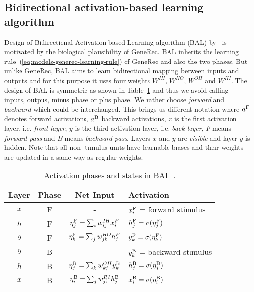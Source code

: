 \subsection{Bidirectional activation-based learning algorithm} 
\label{sec:models-bal} 

Design of Bidirectional Activation-based Learning algorithm (BAL) by~\citet{farkas2013bal} is motivated by the biological plausibility of GeneRec. BAL inherits the learning rule~(\ref{eq:models-generec-learning-rule}) of GeneRec and also the two phases. But unlike GeneRec, BAL aims to learn bidirectional mapping between inputs and outputs and for this purpose it uses four weights $W^{IH}$, $W^{HO}$, $W^{OH}$ and $W^{HI}$. The design of BAL is symmetric as shown in Table~\ref{tab:models-bal-activation} and thus we avoid calling inputs, outpus, minus phase or plus phase. We rather choose \emph{forward} and \emph{backward} which could be interchanged. This brings us different notation where $a^{\rm F}$ denotes forward activations, $a^{\rm B}$ backward activations, $x$ is the first activation layer, i.e. \emph{front layer}, $y$ is the third activation layer, i.e. \emph{back layer}, $F$ means \emph{forward pass} and $B$ means \emph{backward pass}. Layers $x$ and $y$ are \emph{visible} and layer $y$ is hidden. Note that all non- timulus units have learnable biases and their weights are updated in a same way as regular weights.

\begin{table}[H]
  \centering
  \begin{tabular}{|cccl|}
    \hline
    Layer & Phase & Net Input & Activation\\
    \hline
    $x$ & F & - & $x^{\rm F}_i$ = forward stimulus\\ [1ex]
    $h$ & F & \hspace{0.3cm}$\eta^{\rm F}_j = \sum_i w_{ij}^{IH}x^{F}_i$\hspace{0.3cm} & $h^{\rm F}_j = \sigma(\eta^{\rm F}_j)$\hspace{0.3cm}\\ [1ex]
    $y$ & F & $\eta^{\rm F}_k = \sum_j w_{jk}^{HO}h^{F}_j$ & $y^{\rm F}_k = \sigma(\eta^{\rm F}_k)$\\ [1ex]
    \hline
    $y$ & B & - & $y^{\rm B}_k$ = backward stimulus\\ [1ex]
    $h$ & B & $\eta^{\rm B}_j = \sum_k w_{kj}^{OH}y^{\rm B}_k$ & $h^{\rm B}_j = \sigma(\eta^{\rm B}_j)$\\ [1ex]
    $x$ & B  & $\eta^{\rm B}_i = \sum_j w_{ji}^{HI}h^{\rm B}_j$ & $x^{\rm B}_i = \sigma(\eta^{\rm B}_i)$\\
    \hline
  \end{tabular}
  \caption{Activation phases and states in BAL~\citep{farkas2013bal}. } 
  \label{tab:models-bal-activation}
\end{table}

